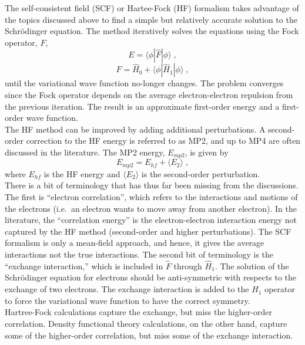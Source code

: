 \documentclass[12pt]{report}
\begin{document}
The self-consistent field (SCF) or Hartee-Fock (HF) formalism takes advantage
of the topics discussed above to find a simple but relatively accurate
solution to the Schr\"{o}dinger equation.
The method iteratively solves the equations using the Fock operator, $F$,
\begin{equation}
 E = \langle\phi|\hat F|\phi\rangle \; ,
\end{equation}
\begin{equation}
 \hat F = \hat H_0+\langle\phi|\hat H_1|\phi\rangle \; ,
\end{equation}
until the variational wave function no-longer changes.
The problem converges since the Fock operator depends on the average
electron-electron repulsion from the previous iteration.
The result is an approximate first-order energy and a first-order wave
function. \\

The HF method can be improved by adding additional perturbations.
A second-order correction to the HF energy is referred to as MP2, and up to
MP4 are often discussed in the literature.
The MP2 energy, $E_{mp2}$, is given by
\begin{equation}
 E_{mp2} = E_{hf} + \langle E_{2} \rangle \; ,
\end{equation}
where $E_{hf}$ is the HF energy and $\langle E_2 \rangle$ is the second-order
perturbation. \\

There is a bit of terminology that has thus far been missing from the
discussions.
The first is ``electron correlation'', which refers to the interactions and
motions of the electrons (i.e.\ an electron wants to move away from another
electron).
In the literature, the ``correlation energy'' is the electron-electron
interaction energy not captured by the HF method (second-order and higher
perturbations).
The SCF formalism is only a mean-field approach, and hence, it gives the
average interactions not the true interactions.
The second bit of terminology is the ``exchange interaction,'' which is
included in $\hat F$ through $\hat H_1$.
The solution of the Schr\"{o}dinger equation for electrons should be
anti-symmetric with respects to the exchange of two electrons.
The exchange interaction is added to the $\hat H_1$ operator to force the
variational wave function to have the correct symmetry. \\

Hartree-Fock calculations capture the exchange, but miss the higher-order
correlation.
Density functional theory calculations, on the other hand, capture some of the
higher-order correlation, but miss some of the exchange interaction.
\end{document}
